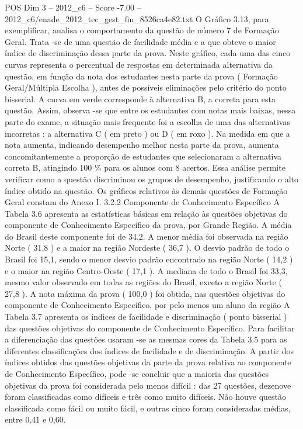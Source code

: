 \begin{textsample}{POS Dim 3 – 2012\_c6 – Score -7.00 – 2012\_c6/enade\_2012\_tec\_gest\_fin\_8526ca4e82.txt}
O Gráfico 3.13, para exemplificar, analisa o comportamento da questão de número 7 de Formação Geral.
Trata -se de uma questão de facilidade média e a que obteve o maior índice de discriminação dessa parte da prova.
Neste gráfico, cada uma das cinco curvas representa o percentual de respostas em determinada alternativa da questão, em função da nota dos estudantes nesta parte da prova ( Formação Geral/Múltipla Escolha ), antes de possíveis eliminações pelo critério do ponto bisserial.
A curva em verde corresponde à alternativa B, a correta para esta questão.
Assim, observa -se que entre os estudantes com notas mais baixas, nessa parte do exame, a situação mais frequente foi a escolha de uma das alternativas incorretas : a alternativa C ( em preto ) ou D ( em roxo ).
Na medida em que a nota aumenta, indicando desempenho melhor nesta parte da prova, aumenta concomitantemente a proporção de estudantes que selecionaram a alternativa correta B, atingindo 100 \% para os alunos com 8 acertos.
Essa análise permite verificar como a questão discriminou os grupos de desempenho, justificando o alto índice obtido na questão.
Os gráficos relativos às demais questões de Formação Geral constam do Anexo I. 3.2.2 Componente de Conhecimento Específico A Tabela 3.6 apresenta as estatísticas básicas em relação às questões objetivas do componente de Conhecimento Específico da prova, por Grande Região.
A média do Brasil deste componente foi de 34,2.
A menor média foi observada na região Norte ( 31,8 ) e a maior na região Nordeste ( 36,7 ).
O desvio padrão de todo o Brasil foi 15,1, sendo o menor desvio padrão encontrado na região Norte ( 14,2 ) e o maior na região Centro-Oeste ( 17,1 ).
A mediana de todo o Brasil foi 33,3, mesmo valor observado em todas as regiões do Brasil, exceto a região Norte ( 27,8 ).
A nota máxima da prova ( 100,0 ) foi obtida, nas questões objetivas do componente de Conhecimento Específico, por pelo menos um aluno da região A Tabela 3.7 apresenta os índices de facilidade e discriminação ( ponto bisserial ) das questões objetivas do componente de Conhecimento Específico.
Para facilitar a diferenciação das questões usaram -se as mesmas cores da Tabela 3.5 para as diferentes classificações dos índices de facilidade e de discriminação.
A partir dos índices obtidos das questões objetivas da parte da prova relativa ao componente de Conhecimento Específico, pode -se concluir que a maioria das questões objetivas da prova foi considerada pelo menos difícil : das 27 questões, dezenove foram classificadas como difíceis e três como muito difíceis.
Não houve questão classificada como fácil ou muito fácil, e outras cinco foram consideradas médias, entre 0,41 e 0,60.

\end{textsample}
